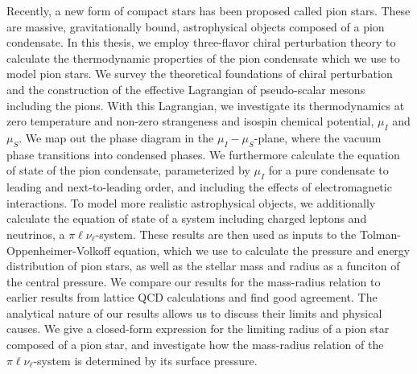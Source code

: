 Recently, a new form of compact stars has been proposed called pion stars.
These are massive, gravitationally bound, astrophysical objects composed of a pion condensate.
In this thesis, we employ three-flavor chiral perturbation theory to calculate the thermodynamic properties of the pion condensate which we use to model pion stars.
We survey the theoretical foundations of chiral perturbation and the construction of the effective Lagrangian of pseudo-scalar mesons including the pions.
With this Lagrangian, we investigate its thermodynamics at zero temperature and non-zero strangeness and isospin chemical potential, $\mu_I$ and $\mu_S$.
We map out the phase diagram in the $\mu_I-\mu_S$-plane, where the vacuum phase transitions into condensed phases.
We furthermore calculate the equation of state of the pion condensate, parameterized by $\mu_I$ for a pure condensate to leading and next-to-leading order, and including the effects of electromagnetic interactions.
To model more realistic astrophysical objects, we additionally calculate the equation of state of a system including charged leptons and neutrinos, a $\pi\ell\nu_\ell$-system.
These results are then used as inputs to the Tolman-Oppenheimer-Volkoff equation, which we use to calculate the pressure and energy distribution of pion stars, as well as the stellar mass and radius as a funciton of the central pressure.
We compare our results for the mass-radius relation to earlier results from lattice QCD calculations and find good agreement.
The analytical nature of our results allows us to discuss their limits and physical causes.
We give a closed-form expression for the limiting radius of a pion star composed of a pion star, and investigate how the mass-radius relation of the  $\pi\ell\nu_\ell$-system is determined by its surface pressure.


